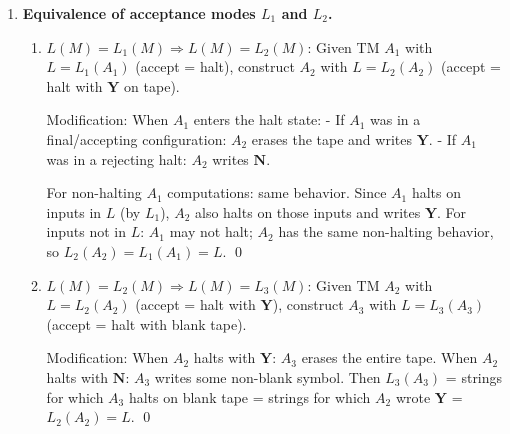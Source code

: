 \begin{enumerate}[{11.}1. ]
\begin{enumerate}
\item \textbf{Inverse homomorphism}: $M'$ on input $x$ computes $h(x)$ and simulates $M$ on $h(x)$. Since $h$ is a computable function (homomorphisms are computable), this works. So $h^{-1}(L)\in\TSIG$.

\item \textbf{Concatenation}: Given TMs $M_1$ and $M_2$ for $L_1$ and $L_2$, a nondeterministic TM $M$ for $L_1\cdot L_2$ guesses a split point $x=uv$, simulates $M_1$ on $u$ and $M_2$ on $v$, accepts if both accept.

\item \textbf{Substitution}: For each symbol $a\in\Sigma$, let $L_a\in\TSIG$. The substitution $L[a\mapsto L_a]$ replaces each $a$ in words of $L$ with words from $L_a$. A nondeterministic TM handles this by guessing the substitution. \qed
\end{enumerate}

\item \textbf{Equivalence of acceptance modes $L_1$ and $L_2$.}

\begin{enumerate}
\item \textbf{$L(M)=L_1(M) \Rightarrow L(M)=L_2(M)$}: Given TM $A_1$ with $L = L_1(A_1)$ (accept = halt), construct $A_2$ with $L = L_2(A_2)$ (accept = halt with $\pmb{Y}$ on tape).

Modification: When $A_1$ enters the halt state:
- If $A_1$ was in a final/accepting configuration: $A_2$ erases the tape and writes $\pmb{Y}$.
- If $A_1$ was in a rejecting halt: $A_2$ writes $\pmb{N}$.

For non-halting $A_1$ computations: same behavior. Since $A_1$ halts on inputs in $L$ (by $L_1$), $A_2$ also halts on those inputs and writes $\pmb{Y}$. For inputs not in $L$: $A_1$ may not halt; $A_2$ has the same non-halting behavior, so $L_2(A_2) = L_1(A_1) = L$. \qed

\item \textbf{$L(M)=L_2(M) \Rightarrow L(M)=L_3(M)$}: Given TM $A_2$ with $L = L_2(A_2)$ (accept = halt with $\pmb{Y}$), construct $A_3$ with $L = L_3(A_3)$ (accept = halt with blank tape).

Modification: When $A_2$ halts with $\pmb{Y}$: $A_3$ erases the entire tape.
When $A_2$ halts with $\pmb{N}$: $A_3$ writes some non-blank symbol.
Then $L_3(A_3)$ = strings for which $A_3$ halts on blank tape = strings for which $A_2$ wrote $\pmb{Y}$ = $L_2(A_2) = L$. \qed
\end{enumerate}


\end{enumerate}
